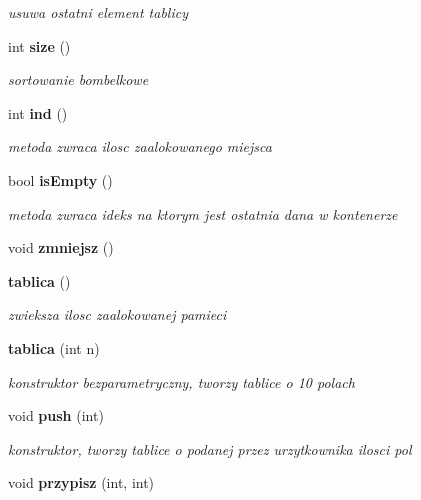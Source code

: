 \begin{DoxyCompactItemize}
\begin{DoxyCompactList}\small\item\em usuwa ostatni element tablicy \end{DoxyCompactList}\item 
int {\bf size} ()\label{classtablica_a8bd6d80f7531cf88748fe96f3082985b}

\begin{DoxyCompactList}\small\item\em sortowanie bombelkowe \end{DoxyCompactList}\item 
int {\bf ind} ()\label{classtablica_a6c6f6d3b9c1b5e51b3eb17c9c778c902}

\begin{DoxyCompactList}\small\item\em metoda zwraca ilosc zaalokowanego miejsca \end{DoxyCompactList}\item 
bool {\bf is\+Empty} ()\label{classtablica_ac0e975ae036568f85ec707bd7c2eba33}

\begin{DoxyCompactList}\small\item\em metoda zwraca ideks na ktorym jest ostatnia dana w kontenerze \end{DoxyCompactList}\item 
void {\bfseries zmniejsz} ()\label{classtablica_a5e2094ab2deb4aca91905f96e0f01b08}

\item 
{\bf tablica} ()\label{classtablica_abc5414ba4d6321ecf744e38a809d9c8f}

\begin{DoxyCompactList}\small\item\em zwieksza ilosc zaalokowanej pamieci \end{DoxyCompactList}\item 
{\bf tablica} (int n)\label{classtablica_a5ee1754d39209bec5987d4cbdf19f210}

\begin{DoxyCompactList}\small\item\em konstruktor bezparametryczny, tworzy tablice o 10 polach \end{DoxyCompactList}\item 
void {\bf push} (int)\label{classtablica_aa558871f57e678103d92b4038c58623f}

\begin{DoxyCompactList}\small\item\em konstruktor, tworzy tablice o podanej przez urzytkownika ilosci pol \end{DoxyCompactList}\item 
void {\bf przypisz} (int, int)\label{classtablica_af615accc61dcccf729ea5f31f03c34e2}


\end{DoxyCompactItemize}
